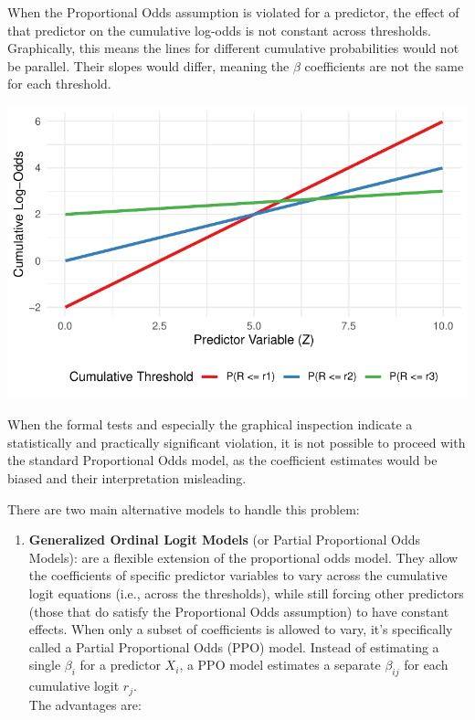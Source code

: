 \documentclass[
  letterpaper,
  DIV=11,
  numbers=noendperiod]{scrartcl}
\providecommand{\tightlist}{%
  \setlength{\itemsep}{0pt}\setlength{\parskip}{0pt}}\usepackage{longtable,booktabs,array}
\begin{document}
When the Proportional Odds assumption is violated for a predictor, the
effect of that predictor on the cumulative log-odds is not constant
across thresholds. Graphically, this means the lines for different
cumulative probabilities would not be parallel. Their slopes would
differ, meaning the \(\beta\) coefficients are not the same for each
threshold.

\includegraphics{Ordinal_data_an_R_files/figure-pdf/unnamed-chunk-10-1.pdf}

When the formal tests and especially the graphical inspection indicate a
statistically and practically significant violation, it is not possible
to proceed with the standard Proportional Odds model, as the coefficient
estimates would be biased and their interpretation misleading.

There are two main alternative models to handle this problem:

\begin{enumerate}
\def\labelenumi{\arabic{enumi}.}
\tightlist
\item
  \textbf{Generalized Ordinal Logit Models} (or Partial Proportional
  Odds Models): are a flexible extension of the proportional odds model.
  They allow the coefficients of specific predictor variables to vary
  across the cumulative logit equations (i.e., across the thresholds),
  while still forcing other predictors (those that do satisfy the
  Proportional Odds assumption) to have constant effects. When only a
  subset of coefficients is allowed to vary, it's specifically called a
  Partial Proportional Odds (PPO) model. Instead of estimating a single
  \(\beta_i\) for a predictor \(X_i\), a PPO model estimates a separate
  \(\beta_{ij}\) for each cumulative logit \(r_j\).\\
  The advantages are:
\end{enumerate}
\end{document}

